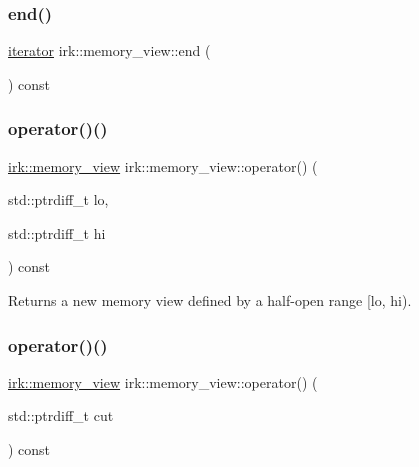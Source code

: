 \subsubsection{\texorpdfstring{end()}{end()}}
{\footnotesize\ttfamily \mbox{\hyperlink{classirk_1_1memory__view_a425bdc98ffa1c1c6cb018b3b4ad64317}{iterator}} irk\+::memory\+\_\+view\+::end (\begin{DoxyParamCaption}{ }\end{DoxyParamCaption}) const\hspace{0.3cm}{\ttfamily [inline]}}

\mbox{\label{classirk_1_1memory__view_a3512cd124a9e37db75e295e1ff9fcf96}} 
\subsubsection{\texorpdfstring{operator()()}{operator()()}\hspace{0.1cm}{\footnotesize\ttfamily [1/2]}}
{\footnotesize\ttfamily \mbox{\hyperlink{classirk_1_1memory__view}{irk\+::memory\+\_\+view}} irk\+::memory\+\_\+view\+::operator() (\begin{DoxyParamCaption}\item[{std\+::ptrdiff\+\_\+t}]{lo,  }\item[{std\+::ptrdiff\+\_\+t}]{hi }\end{DoxyParamCaption}) const\hspace{0.3cm}{\ttfamily [inline]}}



Returns a new memory view defined by a half-\/open range \mbox{[}lo, hi). 

\mbox{\label{classirk_1_1memory__view_a08de0b791c9f50ad1b646e85fb67e734}} 
\subsubsection{\texorpdfstring{operator()()}{operator()()}\hspace{0.1cm}{\footnotesize\ttfamily [2/2]}}
{\footnotesize\ttfamily \mbox{\hyperlink{classirk_1_1memory__view}{irk\+::memory\+\_\+view}} irk\+::memory\+\_\+view\+::operator() (\begin{DoxyParamCaption}\item[{std\+::ptrdiff\+\_\+t}]{cut }\end{DoxyParamCaption}) const\hspace{0.3cm}{\ttfamily [inline]}}



